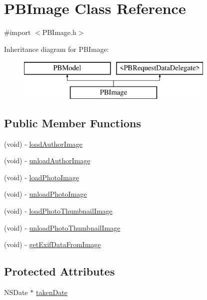\hypertarget{interface_p_b_image}{
\section{PBImage Class Reference}
\label{interface_p_b_image}
}


{\ttfamily \#import $<$PBImage.h$>$}

Inheritance diagram for PBImage:\begin{figure}[H]
\begin{center}
\leavevmode
\includegraphics[height=2cm]{interface_p_b_image}
\end{center}
\end{figure}
\subsection*{Public Member Functions}
\begin{DoxyCompactItemize}
\item 
(void) -\/ \hyperlink{interface_p_b_image_a4af15f2a0b22a1cb6fb88aafbc7fa2d5}{loadAuthorImage}
\item 
(void) -\/ \hyperlink{interface_p_b_image_a309bbbd97bdb73cd5ce68b85dd10d2ef}{unloadAuthorImage}
\item 
(void) -\/ \hyperlink{interface_p_b_image_a97e942803d2815e8cf393da6c6d8c78e}{loadPhotoImage}
\item 
(void) -\/ \hyperlink{interface_p_b_image_a59d1856264f9708693f57071a56a03f5}{unloadPhotoImage}
\item 
(void) -\/ \hyperlink{interface_p_b_image_a002ec7944ae9c0e779867a42af048945}{loadPhotoThumbnailImage}
\item 
(void) -\/ \hyperlink{interface_p_b_image_a4b836242ce7c4ce1cd008a487481d6bf}{unloadPhotoThumbnailImage}
\item 
(void) -\/ \hyperlink{interface_p_b_image_a78fb2648c08eabfa20cca7831d8af078}{getExifDataFromImage}
\end{DoxyCompactItemize}
\subsection*{Protected Attributes}
\begin{DoxyCompactItemize}
\item 
NSDate $\ast$ \hyperlink{interface_p_b_image_a9870fa11fd951bc55b7a115c227f0f97}{takenDate}
\end{DoxyCompactItemize}
